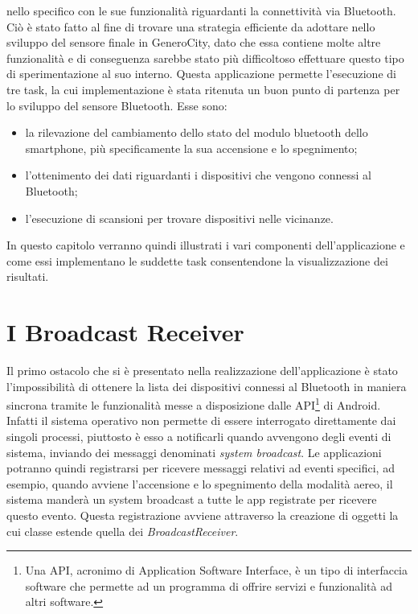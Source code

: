  nello specifico con le sue funzionalità riguardanti la connettività via Bluetooth\cite{ref:bluetooth-doc}. Ciò è stato fatto al fine di trovare una strategia efficiente da adottare nello sviluppo del sensore finale in GeneroCity, dato che essa contiene molte altre funzionalità e di conseguenza sarebbe stato più difficoltoso effettuare questo tipo di sperimentazione al suo interno. Questa applicazione permette l'esecuzione di tre task, la cui implementazione è stata ritenuta un buon punto di partenza per lo sviluppo del sensore Bluetooth. Esse sono:
\begin{itemize}
    \item la rilevazione del cambiamento dello stato del modulo bluetooth dello smartphone, più specificamente la sua accensione e lo spegnimento;
    \item l'ottenimento dei dati riguardanti i dispositivi che vengono connessi al Bluetooth;
    \item l'esecuzione di scansioni per trovare dispositivi nelle vicinanze.
\end{itemize}

In questo capitolo verranno quindi illustrati i vari componenti dell'applicazione e come essi implementano le suddette task consentendone la visualizzazione dei risultati. 

\section{I Broadcast Receiver}
Il primo ostacolo che si è presentato nella realizzazione dell'applicazione è stato l'impossibilità di ottenere la lista dei dispositivi connessi al Bluetooth in maniera sincrona tramite le funzionalità messe a disposizione dalle API\footnote{Una API, acronimo di Application Software Interface, è un tipo di interfaccia software che permette ad un programma di offrire servizi e funzionalità ad altri software.} di Android. Infatti il sistema operativo non permette di essere interrogato direttamente dai singoli processi, piuttosto è esso a notificarli quando avvengono degli eventi di sistema, inviando dei messaggi denominati \textit{system broadcast}. Le applicazioni potranno quindi registrarsi per ricevere messaggi relativi ad eventi specifici, ad esempio, quando avviene l'accensione e lo spegnimento della modalità aereo, il sistema manderà un system broadcast a tutte le app registrate per ricevere questo evento. Questa registrazione avviene attraverso la creazione di oggetti la cui classe estende quella dei \textit{BroadcastReceiver}.\cite{ref:android-broadcast}

